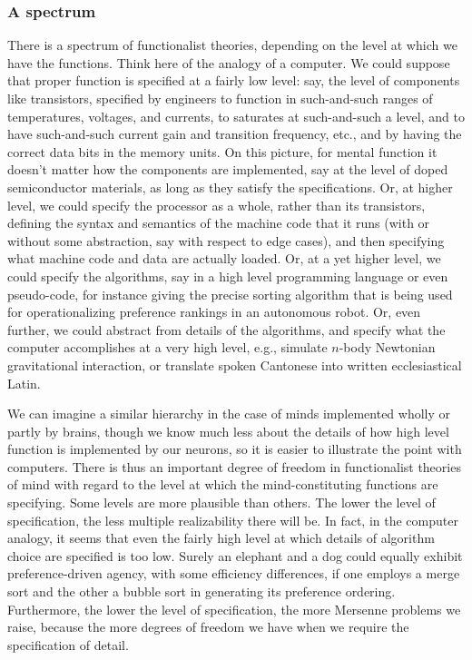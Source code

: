 \subsubsection{A spectrum}
There is a spectrum of functionalist theories, depending on the level at which we have the functions. Think here of the analogy of a computer. 
We could suppose that proper function is specified at a fairly low
level: say, the level of  components like transistors, specified by engineers to 
function in such-and-such ranges of temperatures, voltages, and currents, to saturates at such-and-such a level, 
and to have such-and-such current gain and transition frequency, etc., and by having the correct data bits in 
the memory units. On this picture, for mental function
it doesn't matter how the components are implemented, say at the level of doped semiconductor materials, as long
as they satisfy the specifications. Or, at 
higher level, we could specify the processor as a whole, rather than its transistors, defining the syntax and semantics of the 
machine code that it runs (with or without some abstraction, say with respect to edge cases), and then specifying what machine 
code and data are actually loaded. Or, at a yet higher level, we could specify the algorithms, say in a high level 
programming language or even pseudo-code, for instance giving the precise sorting algorithm that is being used for 
operationalizing preference rankings in an autonomous robot. Or, even further, we could abstract from details of the algorithms, and specify 
what the computer accomplishes at a very high level, e.g., simulate $n$-body Newtonian gravitational interaction, or 
translate spoken Cantonese into written ecclesiastical Latin. 

We can imagine a similar hierarchy in the case of minds
implemented wholly or partly by brains, though we know much less about the details of how high level function is implemented
by our neurons, so it is easier to illustrate the point with computers.
There is thus an important degree of freedom in functionalist theories of mind with regard to the level at which the 
mind-constituting functions are specifying. Some levels are more plausible than others. The lower the level of specification,
the less multiple realizability there will be. In fact, in the computer analogy, it seems that even the fairly high level
at which details of algorithm choice are specified is too low. Surely an elephant and a dog could equally exhibit preference-driven
agency, with some efficiency differences, if one employs a merge sort and the other a bubble sort in generating its preference 
ordering. Furthermore, the lower the level of specification, the more Mersenne problems we raise, because the more degrees of 
freedom we have when we require the specification of detail.

